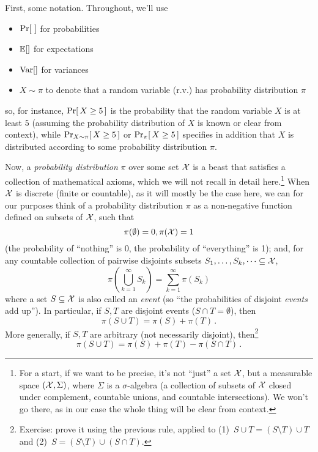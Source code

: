 First, some notation. Throughout, we'll use 
\begin{itemize}
    \item $\probaOf{}$ for probabilities
    \item $\expect{}$ for expectations
    \item $\operatorname{Var}[]$ for variances
    \item  $X \sim \pi$ to denote that a random variable (r.v.) has probability distribution $\pi$
\end{itemize}
so, for instance, $\probaOf{X \geq 5}$ is the probability that the random variable $X$ is at least $5$ (assuming the probability distribution of $X$ is known or clear from context), while $\probaDistrOf{X\sim \pi}{X \geq 5}$ or $\probaDistrOf{\pi}{X \geq 5}$ specifies in addition that $X$ is distributed according to some probability distribution $\pi$.

Now, a \emph{probability distribution} $\pi$ over some set $\mathcal{X}$ is a beast that satisfies a collection of mathematical axioms, which we will not recall in detail here.\footnote{For a start, if we want to be precise, it's not ``just'' a set $\mathcal{X}$, but a measurable space $(\mathcal{X}, \Sigma)$, where $\Sigma$ is a $\sigma$-algebra (a collection of subsets of $\mathcal{X}$ closed under complement, countable unions, and countable intersections). We won't go there, as in our case the whole thing will be clear from context.} When $\mathcal{X}$ is discrete (finite or countable), as it will mostly be the case here, we can for our purposes think of a probability distribution $\pi$ as a non-negative function defined on subsets of $\mathcal{X}$, such that
\[
\pi(\emptyset) = 0, \pi(\mathcal{X})=1
\]
(the probability of ``nothing'' is 0, the probability of ``everything'' is 1); and, for any countable collection of pairwise disjoints subsets $S_1,\dots, S_k,\dots \subseteq \mathcal{X}$,
\[
\pi(\bigcup_{k=1}^\infty S_k)
= \sum_{k=1}^\infty \pi(S_k)
\]
where a set $S\subseteq \mathcal{X}$ is also called an \emph{event} (so ``the probabilities of disjoint \emph{events} add up''). In particular, if $S,T$ are disjoint events ($S\cap T=\emptyset$), then
\[
\pi(S \cup T) = \pi(S)+\pi(T)\,.
\]
More generally, if $S,T$ are arbitrary (not necessarily disjoint), then\footnote{Exercise: prove it using the previous rule, applied to (1)~$S \cup T=(S \setminus T) \cup T$ and (2)~$S = (S\setminus T)\cup (S\cap T)$.}
\[
\pi(S \cup T) = \pi(S)+\pi(T) - \pi(S\cap T)\,.
\]

